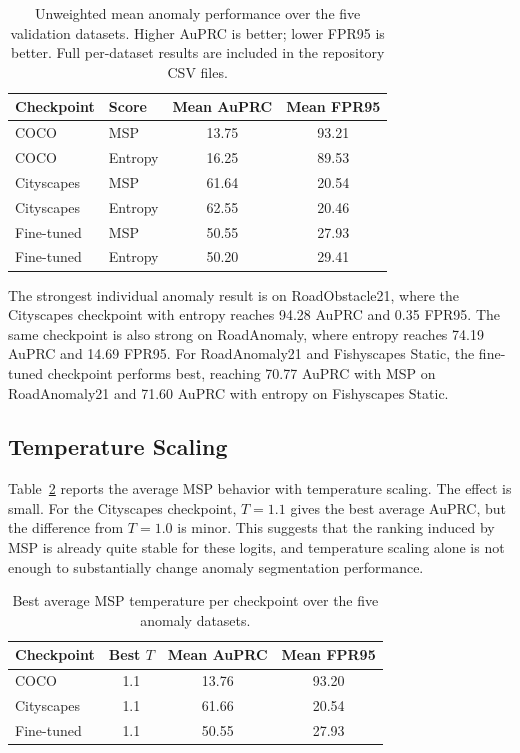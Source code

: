 \begin{table}[t]
\centering
\small
\begin{tabular}{llcc}
\hline
Checkpoint & Score & Mean AuPRC & Mean FPR95 \\
\hline
COCO & MSP & 13.75 & 93.21 \\
COCO & Entropy & 16.25 & 89.53 \\
Cityscapes & MSP & 61.64 & 20.54 \\
Cityscapes & Entropy & 62.55 & 20.46 \\
Fine-tuned & MSP & 50.55 & 27.93 \\
Fine-tuned & Entropy & 50.20 & 29.41 \\
\hline
\end{tabular}
\caption{Unweighted mean anomaly performance over the five validation datasets. Higher AuPRC is better; lower FPR95 is better. Full per-dataset results are included in the repository CSV files.}
\label{tab:anomaly-average}
\end{table}

The strongest individual anomaly result is on RoadObstacle21, where the Cityscapes checkpoint with entropy reaches 94.28 AuPRC and 0.35 FPR95. The same checkpoint is also strong on RoadAnomaly, where entropy reaches 74.19 AuPRC and 14.69 FPR95. For RoadAnomaly21 and Fishyscapes Static, the fine-tuned checkpoint performs best, reaching 70.77 AuPRC with MSP on RoadAnomaly21 and 71.60 AuPRC with entropy on Fishyscapes Static.

\subsection{Temperature Scaling}
Table~\ref{tab:temperature} reports the average MSP behavior with temperature scaling. The effect is small. For the Cityscapes checkpoint, $T=1.1$ gives the best average AuPRC, but the difference from $T=1.0$ is minor. This suggests that the ranking induced by MSP is already quite stable for these logits, and temperature scaling alone is not enough to substantially change anomaly segmentation performance.

\begin{table}[t]
\centering
\small
\begin{tabular}{lccc}
\hline
Checkpoint & Best $T$ & Mean AuPRC & Mean FPR95 \\
\hline
COCO & 1.1 & 13.76 & 93.20 \\
Cityscapes & 1.1 & 61.66 & 20.54 \\
Fine-tuned & 1.1 & 50.55 & 27.93 \\
\hline
\end{tabular}
\caption{Best average MSP temperature per checkpoint over the five anomaly datasets.}
\label{tab:temperature}
\end{table}

